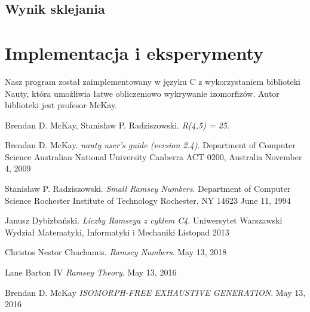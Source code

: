 \documentclass[11pt]{article}
\begin{document}
\subsection{Wynik sklejania}


\section{Implementacja i eksperymenty}
Nasz program został zaimplementowany w języku C z wykorzystaniem biblioteki Nauty, która umożliwia łatwe obliczeniowo wykrywanie izomorfizów.
Autor biblioteki jest profesor McKay. 

\begin{thebibliography}{9}
  Brendan D. McKay, Stanisław P. Radziszowski. 
  \textit{R(4,5) = 25}. 
  
  Brendan D. McKay.
  \textit{nauty user's guide (version 2.4)}.  
  Department of Computer Science
  Australian National University
  Canberra ACT 0200, Australia
  November 4, 2009

  Stanisław P. Radziszowski.
  \textit{Small Ramsey Numbers}.  
  Department of Computer Science Rochester Institute of Technology Rochester, NY 14623
  June 11, 1994

  Janusz Dybizbański.
  \textit{Liczby Ramseya z cyklem C4}.  
  Uniwersytet Warszawski
  Wydział Matematyki, Informatyki i Mechaniki
  Listopad 2013

  Christos Nestor Chachamis.
  \textit{Ramsey Numbers}.  
  May 13, 2018

  Lane Barton IV
  \textit{Ramsey Theory}.  
  May 13, 2016

  Brendan D. McKay
  \textit{ISOMORPH-FREE EXHAUSTIVE GENERATION}.  
  May 13, 2016

  \end{thebibliography}
\end{document}
